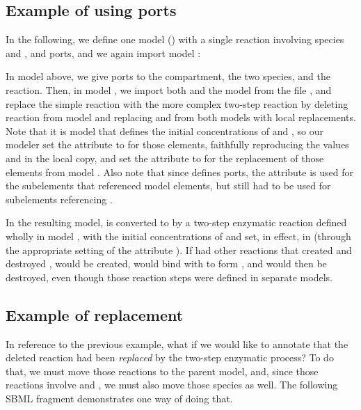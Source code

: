 \subsection{Example of using ports}

In the following, we define one model () with a single
reaction involving species  and , and ports, and we
again import model :


In model  above, we give ports to the compartment, the two
species, and the reaction.  Then, in model , we import
both  and the model  from the file
, and replace the simple reaction with the more
complex two-step reaction by deleting reaction  from model
 and replacing  and  from both models with
local replacements.  Note that it is model  that defines the
initial concentrations of  and , so our modeler set the
attribute  to  for those elements, faithfully
reproducing the values  and  in the local copy, and set
the attribute  to  for the replacement of
those elements from model .  Also note that since
 defines ports, the  attribute is used for the
subelements that referenced  model elements, but
 still had to be used for subelements referencing
.

In the resulting model,  is converted to  by a two-step
enzymatic reaction defined wholly in model , with the
initial concentrations of  and  set, in effect, in
 (through the appropriate setting of the attribute
).  If  had other reactions that created
 and destroyed ,  would be created, would bind with
 to form , and  would then be destroyed, even
though those reaction steps were defined in separate models.


\subsection{Example of replacement}

In reference to the previous example, what if we would like to annotate
that the deleted reaction had been \emph{replaced} by the two-step
enzymatic process?  To do that, we must move those reactions to the
parent model, and, since those reactions involve  and ,
we must also move those species as well.  The following SBML fragment
demonstrates one way of doing that.

